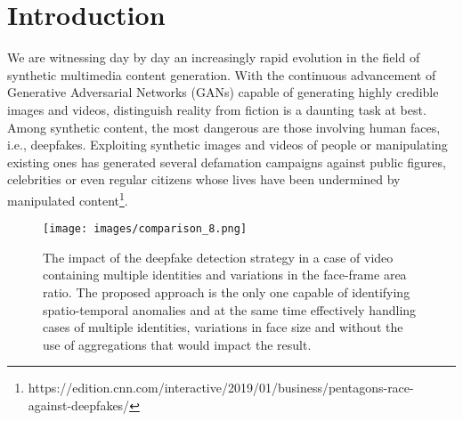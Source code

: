 \documentclass[10pt,twocolumn,letterpaper]{article}
\begin{document}
\section{Introduction}
\label{sec:intro}



We are witnessing day by day an increasingly rapid evolution in the field of synthetic multimedia content generation. With the continuous advancement of Generative Adversarial Networks (GANs)\cite{NIPS2014_5ca3e9b1}  capable of generating highly credible images and videos, distinguish reality from fiction is a daunting task at best. Among synthetic content, the most dangerous are those involving human faces, i.e., deepfakes. Exploiting synthetic images and videos of people or manipulating existing ones has generated several defamation campaigns against public figures, celebrities or even regular citizens whose lives have been undermined by manipulated content\footnote{https://edition.cnn.com/interactive/2019/01/business/pentagons-race-against-deepfakes/}. 

\iffalse
Famous and very significant was its use during the war between Russia and Ukraine. Already during the first months of the war, a deepfake video of the Ukraine's president, Zelensky, declaring his surrender was disseminated and was even shared by some local television stations, which were fooled by the credibility of the video. Events like this demonstrate how deepfakes can in effect be a powerful weapon and dangerous sources of fake news. 
A recent report by the Europol Innovation Lab highlighted the danger that deepfakes could potentially be used for multiple serious crimes such as: CEO fraud, evidence tampering, and the production of non-consensual pornography and according to experts, by 2026, 90\% of online content will be synthetic\footnote{Facing reality? Law enforcement and the challenge of
deepfakes, an observatory report from the europol innovation
lab: \url{https://www.europol.europa.eu/publications-events/publications/facing-reality-law-enforcement-and-challenge-of-deepfakes}}.
\fi



\begin{figure}[t]
    \centering
    \texttt{[image: images/comparison\_8.png]} \caption{The impact of the deepfake detection strategy in a case of video containing multiple identities and variations in the face-frame area ratio. The proposed approach is the only one capable of identifying spatio-temporal anomalies and at the same time effectively handling cases of multiple identities, variations in face size and without the use of aggregations that would impact the result.}
    \label{fig:comparison_deepfake}
\end{figure}
\end{document}
